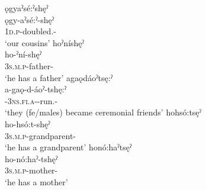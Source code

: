 \ea\label{ex:declare.kin}
\ea ǫgyaˀsé:ˀshęˀ\\
\gll ǫgy-aˀsé:ˀ-shęˀ\\
 \textsc{1d.p}-doubled.{\stative}-{\declarekinship}\\
\glt `our cousins'
\ex hoˀníshęˀ\\
\gll ho-ˀní-shęˀ\\
 \textsc{3s.m.p}-father-{\declarekinship}\\
\glt `he has a father'
\ex agaǫdáoˀtsę:ˀ\\
\gll a-gaǫ-d-áoˀ-tshę:ˀ\\
 {\factual}-\textsc{3ns.fi.a}-{\semireflexive}-run.{\stative}-{\declarekinship}\\
\glt `they (fe/males) became ceremonial friends'
\newpage
\ex hohsó:tsęˀ\\
\gll ho-hsó:t-shęˀ\\
 \textsc{3s.m.p}-grandparent-{\declarekinship}\\
\glt `he has a grandparent'
\ex honó:haˀtsęˀ\\
\gll ho-nó:haˀ-tshęˀ\\
 \textsc{3s.m.p}-mother-{\declarekinship}\\
\glt `he has a mother'
\z
\z



